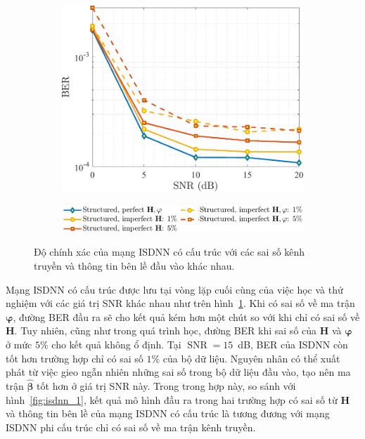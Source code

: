 \begin{figure}[ht]
    \centering
    \begin{subfigure}{\linewidth}
        \includegraphics[width=\linewidth]{figures/performance_3.pdf}
    \end{subfigure}
    \hfill
    \begin{subfigure}{\linewidth}
        \centering
        \includegraphics[width=.8\linewidth]{figures/lg_performance_31.pdf}
    \end{subfigure}
    \caption{Độ chính xác của mạng ISDNN có cấu trúc với các sai số kênh truyền và thông tin bên lề đầu vào khác nhau.}
    \label{fig:isdnn_3}
\end{figure}

Mạng ISDNN có cấu trúc được lưu tại vòng lặp cuối cùng của việc học và thử nghiệm với các giá trị SNR khác nhau như trên hình~\ref{fig:isdnn_3}. Khi có sai số về ma trận $\boldsymbol{\varphi}$, đường BER đầu ra sẽ cho kết quả kém hơn một chút so với khi chỉ có sai số về $\mathbf{H}$. Tuy nhiên, cũng như trong quá trình học, đường BER khi sai số của $\mathbf{H}$ và $\boldsymbol{\varphi}$ ở mức $5\%$ cho kết quả không ổ định. Tại $\operatorname{SNR}=15$~dB, BER của ISDNN còn tốt hơn trường hợp chỉ có sai số $1\%$ của bộ dữ liệu. Nguyên nhân có thể xuất phát từ việc gieo ngẫn nhiên những sai số trong bộ dữ liệu đầu vào, tạo nên ma trận $\hat{\boldsymbol{\beta}}$ tốt hơn ở giá trị SNR này. Trong trong hợp này, so sánh với hình~\ref{fig:isdnn_1}, kết quả mô hình đầu ra trong hai trường hợp có sai số từ $\mathbf{H}$ và thông tin bên lề của mạng ISDNN có cấu trúc là tương đương với mạng ISDNN phi cấu trúc chỉ có sai số về ma trận kênh truyền.
